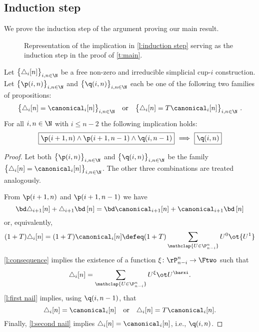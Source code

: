 \subsection{Induction step}\label{ss:step}

We prove the induction step of the argument proving our main result.

\begin{figure}
	\centering
	
	\caption{Representation of the implication in \cref{l:induction step} serving as the induction step in the proof of \cref{t:main}.}
	\label{f:induction step}
\end{figure}

\begin{lemma}\label{l:induction step}
	Let $\big\{ \triangle_i [n] \big\}_{i,n\in\N}$ be a free non-zero and irreducible simplicial \mbox{cup-$i$} construction.
	Let $\big\{ \p(i,n) \big\}_{i,n \in \N}$ and $\big\{ \q(i,n) \big\}_{i,n \in \N}$ each be one of the following two families of propositions:
	\[
	\big\{ \triangle_i [n] = \canonical_ i [n] \big\}_{i,n \in \N}
	\quad \text{or} \quad
	\big\{ \triangle_i [n] = T \canonical_ i [n] \big\}_{i,n \in \N} \ .
	\]
	For all $i,n \in \N$ with $i \leq n-2$ the following implication holds:
	\[
	\boxed{\p(i+1,n) \wedge \p(i+1,n-1) \wedge \q(i,n-1)}\ \Longrightarrow\ \boxed{\q(i,n)}
	\]
\end{lemma}

\begin{proof}
	Let both $\big\{ \p(i,n) \big\}_{i,n\in\N}$ and $\big\{ \q(i,n) \big\}_{i,n\in\N}$ be the family $\big\{ \triangle_i [n] = \canonical_i [n] \big\}_{i,n \in \N}$.
	The other three combinations are treated analogously.

	From $\p(i+1,n)$ and $\p(i+1,n-1)$ we have
	\[
	\bd \triangle_{i+1} [n] + \triangle_{i+1} \bd \, [n] =
	\bd \canonical_{i+1} [n] + \canonical_{i+1} \bd \, [n]
	\]
	or, equivalently,
	\begin{align*}
		(1+T) \triangle_i [n] =
		(1+T) \canonical_i [n] \defeq
		(1+T) \sum_{\mathclap{U \in \P_{n-i}^n}} {U^0} \ot {U^1}
	\end{align*}
	\cref{l:consequence} implies the existence of a function $\xi \colon \rP_{n-i}^n \to \Ftwo$ such that
	\[
	\triangle_i [n] =
	\sum_{\mathclap{U \in \P_{n-i}^n}} U^\xi \ot U^\barxi.
	\]
	\cref{l:first nail} implies, using $\q(i,n-1)$, that
	\[
	\triangle_i [n] = \canonical_i [n]
	\quad \text{or} \quad
	\triangle_i [n] = T \canonical_i [n].
	\]
	Finally, \cref{l:second nail} implies $\triangle_i [n] = \canonical_i [n]$, i.e., $\q(i,n)$.
\end{proof}

